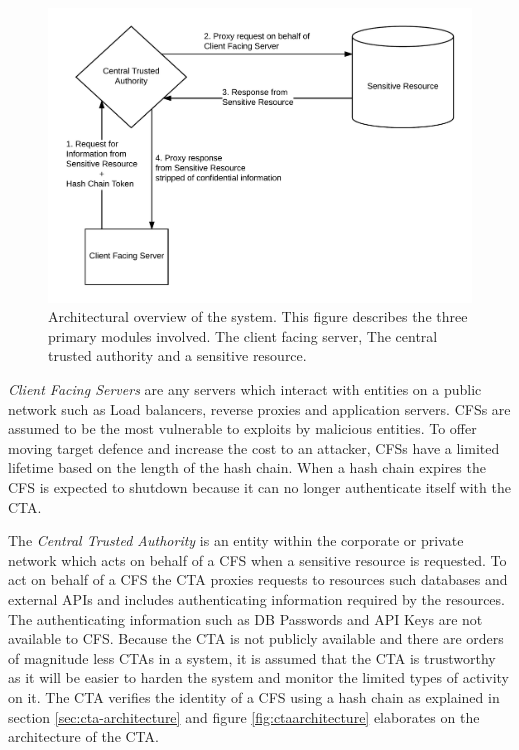 \documentclass[a4paper,twoside]{article}
\begin{document}
\begin{figure}[ht]
\includegraphics[keepaspectratio=true,scale=0.145]{overview_architecture.png}
\caption{Architectural overview of the system. This figure describes the three primary modules involved. The client facing server, The central trusted authority and a sensitive resource.}
\label{fig:architectureoverview} 
\end{figure}

\emph{Client Facing Servers} are any servers which interact with entities on a public network such as Load balancers, reverse proxies and application servers. CFSs are assumed to be the most vulnerable to exploits by malicious entities. To offer moving target defence and increase the cost to an attacker, CFSs have a limited lifetime based on the length of the hash chain. When a hash chain expires the CFS is expected to shutdown because it can no longer authenticate itself with the CTA.

The \emph{Central Trusted Authority} is an entity within the corporate or private network which acts on behalf of a CFS when a sensitive resource is requested. To act on behalf of a CFS the CTA proxies requests to resources such databases and external APIs and includes authenticating information required by the resources. The authenticating information such as DB Passwords and API Keys are not available to CFS.  Because the CTA is not publicly available and there are orders of magnitude less CTAs in a system, it is assumed that the CTA is trustworthy as it will be easier to harden the system and monitor the limited types of activity on it.
The CTA verifies the identity of a CFS using a hash chain as explained in section \ref{sec:cta-architecture} and figure \ref{fig:ctaarchitecture} elaborates on the architecture of the CTA.
\end{document}
